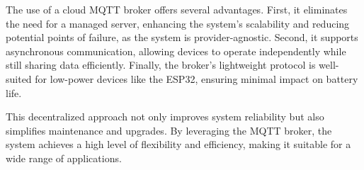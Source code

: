 The use of a cloud MQTT broker offers several advantages. First, it eliminates the need for a managed server, enhancing the system’s scalability and reducing potential points of failure, as the system is provider-agnostic. Second, it supports asynchronous communication, allowing devices to operate independently while still sharing data efficiently. Finally, the broker’s lightweight protocol is well-suited for low-power devices like the ESP32, ensuring minimal impact on battery life.

This decentralized approach not only improves system reliability but also simplifies maintenance and upgrades. By leveraging the MQTT broker, the system achieves a high level of flexibility and efficiency, making it suitable for a wide range of applications.

